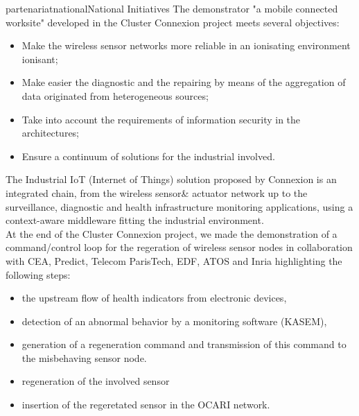 \documentclass{ra2016}
\begin{document}
\begin{module}{partenariat}{national}{National Initiatives}
The demonstrator "a mobile connected worksite" developed in the Cluster Connexion project meets several objectives:
\begin{itemize}
\item	Make the wireless sensor networks more reliable in an  ionisating environment ionisant;
\item	Make easier the diagnostic and the repairing by means of the aggregation of data originated from heterogeneous sources; 
\item	Take into account the requirements of information security in the architectures;
\item Ensure a continuum of solutions for the industrial involved.\\
\end{itemize}

The Industrial IoT (Internet of Things) solution proposed by Connexion is an integrated chain, from the wireless sensor\& actuator network up to the surveillance, diagnostic and health infrastructure monitoring applications, using a context-aware middleware fitting the industrial environment.\\ 

At the end of the Cluster Connexion project, we made the demonstration of a command/control loop for the regeration of wireless sensor nodes in collaboration with CEA, Predict, Telecom ParisTech, EDF, ATOS and Inria highlighting the following steps:
\begin{itemize}
\item the upstream flow of health indicators from electronic devices,
\item detection of an abnormal behavior by a monitoring software (KASEM),  
\item generation of a regeneration command and transmission of this command to the misbehaving sensor node.
\item regeneration of the involved sensor
\item insertion of the regeretated sensor in the OCARI network.\\
\end{itemize}



\end{module}
\end{document}
